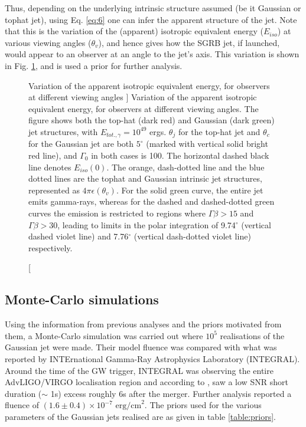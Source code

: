     Thus, depending on the underlying intrinsic structure assumed (be it Gaussian or
    tophat jet), using Eq. \ref{eq:6} one can infer the apparent structure of the jet.
    Note that this is the variation of the (apparent) isotropic equivalent energy
    ($E_{iso}$) at various viewing angles ($\theta_v$), and hence gives how the SGRB
    jet, if launched, would appear to an observer at an angle to the jet's axis. This
    variation is shown in Fig. \ref{fig:e_iso}, and is used a prior for further
    analysis.

    \begin{figure}
        \centering
        \def\svgwidth{\textwidth}
        
        \caption
        [
            Variation of the apparent isotropic equivalent energy, for observers at
            different viewing angles
        ]
        {
            Variation of the apparent isotropic equivalent energy, for observers at
            different viewing angles. The figure shows both the top-hat (dark red)
            and Gaussian (dark green) jet structures, with $E_{tot., \gamma} =
            10^{49}$ ergs. $\theta_j$ for the top-hat jet and $\theta_c$ for the
            Gaussian jet are both $5^{\circ}$ (marked with vertical solid bright
            red line), and $\Gamma_0$ in both cases is 100. The horizontal dashed
            black line denotes $E_{iso}(0)$. The orange, dash-dotted line and the
            blue dotted lines are the tophat and Gaussian intrinsic jet structures,
            represented as $4\pi\epsilon(\theta_v)$. For the solid green curve, the
            entire jet emits gamma-rays, whereas for the dashed and dashed-dotted
            green curves the emission is restricted to regions where $\Gamma \beta
            > 15$ and $\Gamma \beta  > 30$, leading to limits in the polar
            integration of 9.74$^\circ$ (vertical dashed violet line) and
            7.76$^\circ$ (vertical dash-dotted violet line) respectively.
        }
        \label{fig:e_iso}
    \end{figure}

    \subsection{Monte-Carlo simulations}
    \label{sec:mc_sim}

    Using the information from previous analyses and the priors motivated from them, a
    Monte-Carlo simulation was carried out where $10^5$ realisations of the Gaussian jet
    were made. Their model fluence was compared with what was reported by INTErnational
    Gamma-Ray Astrophysics Laboratory (INTEGRAL).\\
    Around the time of the GW trigger, INTEGRAL was observing the entire AdvLIGO/VIRGO
    localisation region and according to \cite{minaev_gcn_2019}, saw a low SNR short
    duration ($\sim$ 1s) excess roughly 6s after the merger. Further analysis reported a
    fluence of $(1.6 \pm 0.4) \times 10^{-7} \text{ erg/cm}^2$. The priors used for the
    various parameters of the Gaussian jets realised are as given in table
    \ref{table:priors}.

